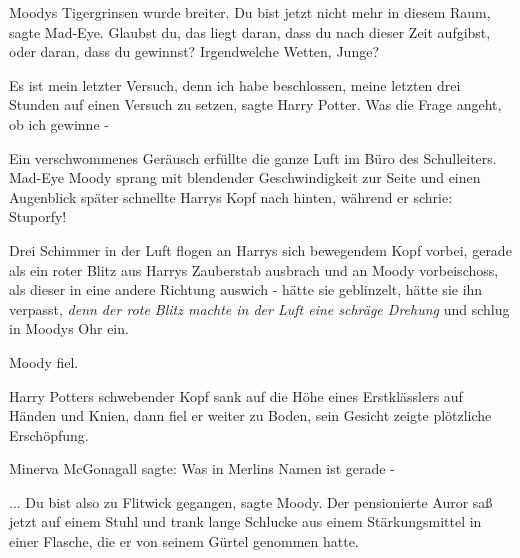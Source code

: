 Moodys Tigergrinsen wurde breiter. \glqq Du bist jetzt nicht mehr in diesem
Raum\grqq{}, sagte Mad-Eye. \glqq Glaubst du, das liegt daran, dass du nach
dieser Zeit aufgibst, oder daran, dass du gewinnst? Irgendwelche Wetten,
Junge?\grqq{}

\glqq Es ist mein letzter Versuch, denn ich habe beschlossen, meine letzten drei
Stunden auf einen Versuch zu setzen\grqq{}, sagte Harry Potter. \glqq Was die
Frage angeht, ob ich gewinne -\grqq{}

Ein verschwommenes Geräusch erfüllte die ganze Luft im Büro des Schulleiters.
Mad-Eye Moody sprang mit blendender Geschwindigkeit zur Seite und einen
Augenblick später schnellte Harrys Kopf nach hinten, während er schrie: \glqq
Stuporfy!\grqq{}

Drei Schimmer in der Luft flogen an Harrys sich bewegendem Kopf vorbei, gerade
als ein roter Blitz aus Harrys Zauberstab ausbrach und an Moody vorbeischoss,
als dieser in eine andere Richtung auswich - hätte sie geblinzelt, hätte sie ihn
verpasst, \emph{denn der rote Blitz machte in der Luft eine schräge Drehung} und
schlug in Moodys Ohr ein.

Moody fiel.

Harry Potters schwebender Kopf sank auf die Höhe eines Erstklässlers auf Händen
und Knien, dann fiel er weiter zu Boden, sein Gesicht zeigte plötzliche
Erschöpfung.

Minerva McGonagall sagte: \glqq Was in Merlins Namen ist gerade -\grqq{}

... \glqq Du bist also zu Flitwick gegangen\grqq{}, sagte Moody. Der
pensionierte Auror saß jetzt auf einem Stuhl und trank lange Schlucke aus einem
Stärkungsmittel in einer Flasche, die er von seinem Gürtel genommen hatte.

